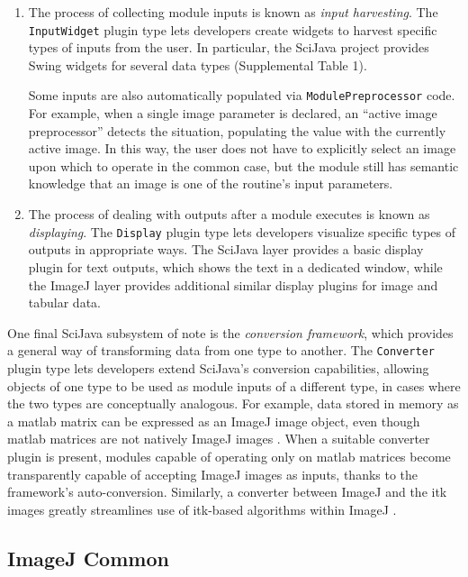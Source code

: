 \documentclass{bmcart}
\begin{document}
\begin{enumerate}
  \item {The process of collecting module inputs is known as \textit{input
    harvesting}. The \texttt{InputWidget} plugin type lets developers create
    widgets to harvest specific types of inputs from the user. In particular,
    the SciJava project provides Swing widgets for several data types
    (Supplemental Table 1).

    Some inputs are also automatically populated via
    \texttt{ModulePreprocessor} code. For example, when a single image
    parameter is declared, an ``active image preprocessor'' detects the
    situation, populating the value with the currently active image. In this
    way, the user does not have to explicitly select an image upon which to
    operate in the common case, but the module still has semantic knowledge
    that an image is one of the routine's input parameters.}
  \item The process of dealing with outputs after a module executes is known as
    \textit{displaying}. The \texttt{Display} plugin type lets developers
    visualize specific types of outputs in appropriate ways. The SciJava layer
    provides a basic display plugin for text outputs, which shows the text in a
    dedicated window, while the ImageJ layer provides additional similar
    display plugins for image and tabular data.
\end{enumerate}

One final SciJava subsystem of note is the \textit{conversion framework}, which
provides a general way of transforming data from one type to another. The
\texttt{Converter} plugin type lets developers extend SciJava's conversion
capabilities, allowing objects of one type to be used as module inputs of a
different type, in cases where the two types are conceptually analogous. For
example, data stored in memory as a \acrfull{matlab} matrix can be expressed as
an ImageJ image object, even though \acrshort{matlab} matrices are not natively
ImageJ images \cite{imagej_matlab}. When a suitable converter plugin is
present, modules capable of operating only on \acrshort{matlab} matrices become
transparently capable of accepting ImageJ images as inputs, thanks to the
framework's auto-conversion. Similarly, a converter between ImageJ and the
\acrfull{itk} \cite{itk} images greatly streamlines use of \acrshort{itk}-based
algorithms within ImageJ \cite{imagej_itk}.

\subsection*{ImageJ Common}
\end{document}
